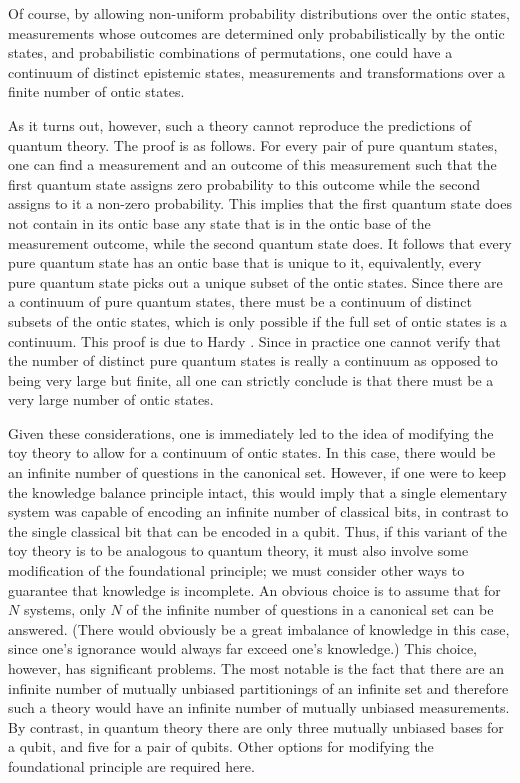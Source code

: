 \documentclass[pra,nofootinbib,showpacs,12pt]{revtex4}
\begin{document}
Of course, by allowing non-uniform probability distributions over
the ontic states, measurements whose outcomes are determined only
probabilistically by the ontic states, and probabilistic
combinations of permutations, one could have a continuum of
distinct epistemic states, measurements and transformations over a
finite number of ontic states.

As it turns out, however, such a theory cannot reproduce the
predictions of quantum theory. The proof is as follows. For every
pair of pure quantum states, one can find a measurement and an
outcome of this measurement such that the first quantum state
assigns zero probability to this outcome while the second assigns
to it a non-zero probability. This implies that the first quantum
state does not contain in its ontic base any state that is in the
ontic base of the measurement outcome, while the second quantum
state does. It follows that every pure quantum state has an ontic
base that is unique to it, equivalently, every pure quantum state
picks out a unique subset of the ontic states. Since there are a
continuum of pure quantum states, there must be a continuum of
distinct subsets of the ontic states, which is only possible if
the full set
of ontic states is a continuum. This proof is due to Hardy \cite%
{Hardydiscomfort}. Since in practice one cannot verify that the number of
distinct pure quantum states is really a continuum as opposed to being very
large but finite, all one can strictly conclude is that there must be a very
large number of ontic states.

Given these considerations, one is immediately led to the idea of modifying
the toy theory to allow for a continuum of ontic states. In this case, there
would be an infinite number of questions in the canonical set. However, if
one were to keep the knowledge balance principle intact, this would imply
that a single elementary system was capable of encoding an infinite number
of classical bits, in contrast to the single classical bit that can be
encoded in a qubit. Thus, if this variant of the toy theory is to be
analogous to quantum theory, it must also involve some modification of the
foundational principle; we must consider other ways to guarantee that
knowledge is incomplete. An obvious choice is to assume that for $N$
systems, only $N$ of the infinite number of questions in a canonical set can
be answered. (There would obviously be a great imbalance of knowledge in
this case, since one's ignorance would always far exceed one's knowledge.)
This choice, however, has significant problems. The most notable is the fact
that there are an infinite number of mutually unbiased partitionings of an
infinite set and therefore such a theory would have an infinite number of
mutually unbiased measurements. By contrast, in quantum theory there are
only three mutually unbiased bases for a qubit, and five for a pair of
qubits. Other options for modifying the foundational principle are required
here.
\end{document}
